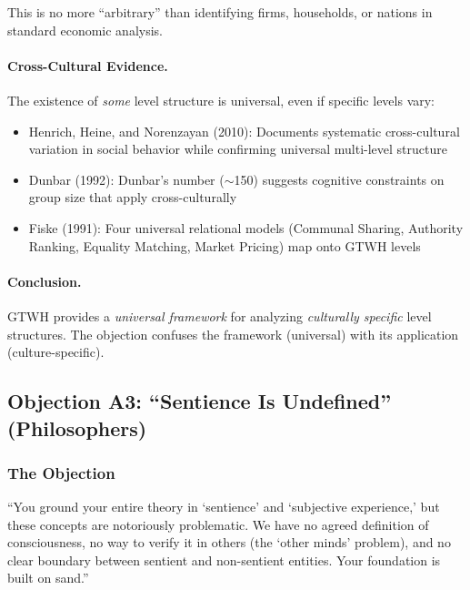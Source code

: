 \documentclass[12pt,a4paper]{article}
\begin{document}
This is no more ``arbitrary'' than identifying firms, households, or nations 
in standard economic analysis.

\paragraph{Cross-Cultural Evidence.}

The existence of \textit{some} level structure is universal, even if specific 
levels vary:
\begin{itemize}[nosep]
\item Henrich, Heine, and Norenzayan (2010): Documents systematic cross-cultural variation 
in social behavior while confirming universal multi-level structure
\item Dunbar (1992): Dunbar's number ($\sim$150) suggests cognitive 
constraints on group size that apply cross-culturally
\item Fiske (1991): Four universal relational models (Communal Sharing, 
Authority Ranking, Equality Matching, Market Pricing) map onto GTWH levels
\end{itemize}

\paragraph{Conclusion.}

GTWH provides a \textit{universal framework} for analyzing \textit{culturally 
specific} level structures. The objection confuses the framework (universal) 
with its application (culture-specific).

\subsection{Objection A3: ``Sentience Is Undefined'' (Philosophers)}
\label{app:sentience}

\subsubsection{The Objection}

\begin{tcolorbox}[colback=red!5!white, colframe=red!75!black, title=Philosopher's Objection]
``You ground your entire theory in `sentience' and `subjective experience,' 
but these concepts are notoriously problematic. We have no agreed definition 
of consciousness, no way to verify it in others (the `other minds' problem), 
and no clear boundary between sentient and non-sentient entities. Your 
foundation is built on sand.''
\end{tcolorbox}
\end{document}
